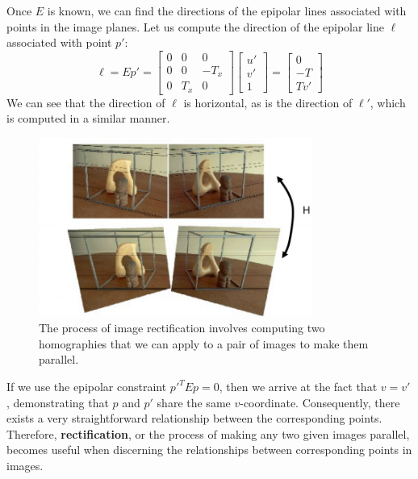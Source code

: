 \documentclass[a4paper, 12pt]{article}
\renewcommand\emph{\textbf}
\begin{document}
Once $E$ is known, we can find the directions of the epipolar lines associated with points in the image planes. Let us compute the direction of the epipolar line $\ell$ associated with point $p'$:
\begin{equation}
\ell = Ep' = \begin{bmatrix} 0 & 0 & 0\\ 0 & 0 & -T_x \\ 0 & T_x  & 0 \end{bmatrix} \begin{bmatrix}u'\\v'\\1\end{bmatrix} = \begin{bmatrix} 0\\ -T \\ Tv'\end{bmatrix}
\end{equation}
We can see that the direction of $\ell$ is horizontal, as is the direction of $\ell'$, which is computed in a similar manner.
\begin{figure}[h!]
\centering
\includegraphics[width=0.8\textwidth]{figures/rectification_example.png}
\caption{The process of image rectification involves computing two homographies that we can apply to a pair of images to make them parallel.}
\label{fig:rectification_example}
\end{figure}
 

If we use the epipolar constraint $p'^T Ep=0$, then we arrive at the fact that $v=v'$, demonstrating that $p$ and $p'$ share the same $v$-coordinate. Consequently, there exists a very straightforward relationship between the corresponding points. Therefore, \emph{rectification}, or the process of making any two given images parallel, becomes useful when discerning the relationships between corresponding points in images.
\end{document}
